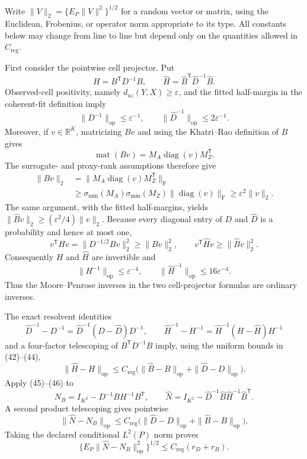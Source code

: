 Write \(\|V\|_2=\{E_P\|V\|^2\}^{1/2}\) for a random vector or matrix, using the Euclidean, Frobenius, or operator norm appropriate to its type.  All constants below may change from line to line but depend only on the quantities allowed in \(C_{\mathrm{reg}}\).

First consider the pointwise cell projector.  Put
\[
 H=B^{\mathsf T}D^{-1}B,
 \qquad
 \widehat H=\widehat B^{\mathsf T}\widehat D^{-1}\widehat B.
 \tag{41}
\]
Observed-cell positivity, namely \(d_{az}(Y,X)\geq\varepsilon\), and the fitted half-margin in the coherent-fit definition imply
\[
 \|D^{-1}\|_{\mathrm{op}}\leq\varepsilon^{-1},
 \qquad
 \|\widehat D^{-1}\|_{\mathrm{op}}\leq2\varepsilon^{-1}.
 \tag{42}
\]
Moreover, if \(v\in\mathbb R^K\), matricizing \(Bv\) and using the Khatri--Rao definition of \(B\) gives
\[
 \operatorname{mat}(Bv)=M_A\operatorname{diag}(v)M_Z^{\mathsf T}.
\]
The surrogate- and proxy-rank assumptions therefore give
\[
\begin{aligned}
 \|Bv\|_2
 &=\|M_A\operatorname{diag}(v)M_Z^{\mathsf T}\|_{\mathrm F}\\
 &\geq \sigma_{\min}(M_A)\sigma_{\min}(M_Z)
       \|\operatorname{diag}(v)\|_{\mathrm F}
 \geq\varepsilon^2\|v\|_2.
\end{aligned}
\tag{43}
\]
The same argument, with the fitted half-margins, yields
\(\|\widehat Bv\|_2\geq(\varepsilon^2/4)\|v\|_2\).  Because every diagonal entry of \(D\) and \(\widehat D\) is a probability and hence at most one,
\[
 v^{\mathsf T}Hv=\|D^{-1/2}Bv\|_2^2\geq\|Bv\|_2^2,
 \qquad
 v^{\mathsf T}\widehat Hv\geq\|\widehat Bv\|_2^2.
\]
Consequently \(H\) and \(\widehat H\) are invertible and
\[
 \|H^{-1}\|_{\mathrm{op}}\leq\varepsilon^{-4},
 \qquad
 \|\widehat H^{-1}\|_{\mathrm{op}}\leq16\varepsilon^{-4}.
 \tag{44}
\]
Thus the Moore--Penrose inverses in the two cell-projector formulas are ordinary inverses.

The exact resolvent identities
\[
 \widehat D^{-1}-D^{-1}
 =\widehat D^{-1}(D-\widehat D)D^{-1},
 \qquad
 \widehat H^{-1}-H^{-1}
 =\widehat H^{-1}(H-\widehat H)H^{-1}
 \tag{45}
\]
and a four-factor telescoping of \(B^{\mathsf T}D^{-1}B\) imply, using the uniform bounds in (42)--(44),
\[
 \|\widehat H-H\|_{\mathrm{op}}
 \leq C_{\mathrm{reg}}
 \bigl(\|\widehat B-B\|_{\mathrm{op}}
       +\|\widehat D-D\|_{\mathrm{op}}\bigr).
 \tag{46}
\]
Apply (45)--(46) to
\[
 N_B=I_{K^2}-D^{-1}BH^{-1}B^{\mathsf T},
 \qquad
 \widehat N=I_{K^2}-\widehat D^{-1}\widehat B
                    \widehat H^{-1}\widehat B^{\mathsf T}.
\]
A second product telescoping gives pointwise
\[
 \|\widehat N-N_B\|_{\mathrm{op}}
 \leq C_{\mathrm{reg}}
 \bigl(\|\widehat D-D\|_{\mathrm{op}}
       +\|\widehat B-B\|_{\mathrm{op}}\bigr).
 \tag{47}
\]
Taking the declared conditional \(L^2(P)\) norm proves
\[
 \{E_P\|\widehat N-N_B\|_{\mathrm{op}}^2\}^{1/2}
 \leq C_{\mathrm{reg}}(r_D+r_B).
 \tag{48}
\]

